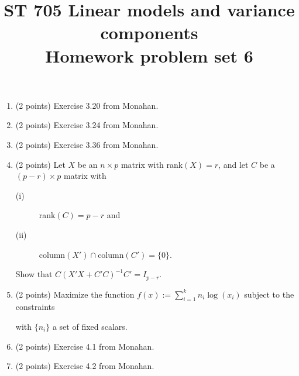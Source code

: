 \documentclass[11pt]{article}
\title{ST 705 Linear models and variance components \\ 
        Homework problem set 6}
\begin{document}
\maketitle

\begin{enumerate}

\item(2 points) Exercise 3.20 from Monahan.

\item(2 points) Exercise 3.24 from Monahan.

\item(2 points) Exercise 3.36 from Monahan.

\item(2 points)  Let $X$ be an $n\times p$ matrix with rank$(X) = r$, and let $C$ be a $(p-r)\times p$ matrix with 
\begin{description}
\item[(i)] rank$(C) = p-r$ and
\item[(ii)] $\text{column}(X') \cap \text{column}(C') = \{0\}$.
\end{description}
Show that $C(X'X + C'C)^{-1}C' = I_{p-r}$.

\item(2 points) Maximize the function $f(x) := \sum_{i=1}^{k}n_{i}\log(x_{i})$ subject to the constraints
with $\{n_{i}\}$ a set of fixed scalars.

\item(2 points) Exercise 4.1 from Monahan.

\item(2 points) Exercise 4.2 from Monahan.

\end{enumerate}
\end{document}
